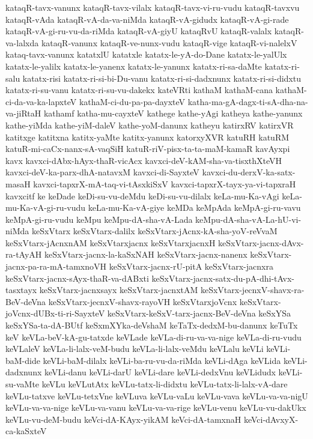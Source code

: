 {kataqR-tavx-vanunx
kataqR-tavx-vilalx
kataqR-tavx-vi-ru-vudu
kataqR-tavxvu
kataqR-vAda
kataqR-vA-da-va-niMda
kataqR-vA-gidudx
kataqR-vA-gi-rade
kataqR-vA-gi-ru-vu-da-riMda
kataqR-vA-giyU
kataqRvU
kataqR-valalx
kataqR-va-lalxda
kataqR-vanunx
kataqR-ve-nunx-vudu
kataqR-vige
kataqR-vi-nalelxV
kataq-tavx-vanunx
katatxlU
katatxle
katatx-le-yA-do-Dane
katatx-le-yalUlx
katatx-le-yalilx
katatx-le-yanenx
katatx-le-yanunx
katatx-ri-sa-daMte
katatx-ri-salu
katatx-risi
katatx-ri-si-bi-Du-vanu
katatx-ri-si-dadxnunx
katatx-ri-si-didxtu
katatx-ri-su-vanu
katatx-ri-su-vu-dakekx
kateVRti
kathaM
kathaM-cana
kathaM-ci-da-va-ka-lapxteV
kathaM-ci-du-pa-pa-dayxteV
katha-ma-gA-dagx-ti-sA-dha-na-va-jiRtaH
kathamf
katha-mu-cayxteV
kathege
kathe-yAgi
katheya
kathe-yanunx
kathe-yiMda
kathe-yiM-daleV
kathe-yoM-danunx
katheyu
katirxRV
katirxVR
katitxge
katitxna
katitx-yaMte
katitx-yanunx
katorxyXVR
katuRH
katuRM
katuR-mi-caCx-nanx-sA-vaqSiH
katuR-riV-pisx-ta-ta-maM-kamaR
kavAyxpi
kavx
kavxci-dAbx-hAyx-thaR-vicAcx
kavxci-deV-kAM-sha-va-tisxthXteVH
kavxci-deV-ka-parx-dhA-natavxM
kavxci-di-SayxteV
kavxci-du-derxV-ka-satx-masaH
kavxci-tapxrX-mA-taq-vi-tAsxkiSxV
kavxci-tapxrX-tayx-ya-vi-tapxraH
kavxcitf
ke
keDade
keDi-su-vu-deMdu
keDi-su-vu-dilalx
keLa-mu-Ka-vAgi
keLa-mu-Ka-vA-gi-ru-vudu
keLa-mu-Ka-vA-giye
keMDa
keMpAda
keMpA-gi-ru-vavu
keMpA-gi-ru-vudu
keMpu
keMpu-dA-sha-vA-Lada
keMpu-dA-sha-vA-La-hU-vi-niMda
keSxVtarx
keSxVtarx-dalilx
keSxVtarx-jAcnx-kA-sha-yoV-reVvaM
keSxVtarx-jAcnxnAM
keSxVtarxjacnx
keSxVtarxjacnxH
keSxVtarx-jacnx-dAvx-ra-tAyAH
keSxVtarx-jacnx-la-kaSxNAH
keSxVtarx-jacnx-nanenx
keSxVtarx-jacnx-pa-ra-mA-tamxnoVH
keSxVtarx-jacnx-rU-pitA
keSxVtarx-jacnxra
keSxVtarx-jacnx-sAyx-thaR-va-dABxti
keSxVtarx-jacnx-satx-du-pA-dhi-tAvx-tasxtayx
keSxVtarx-jacnxsayx
keSxVtarx-jacnxtAM
keSxVtarx-jecnxV-shavx-ra-BeV-deVna
keSxVtarx-jecnxV-shavx-rayoVH
keSxVtarxjoVcnx
keSxVtarx-joVcnx-dUBx-ti-ri-SayxteV
keSxVtarx-keSxV-tarx-jacnx-BeV-deVna
keSxYSa
keSxYSa-ta-dA-BUtf
keSxmXYka-deVshaM
keTaTx-dedxM-bu-danunx
keTuTx
keV
keVLa-beV-kA-gu-tatxde
keVLade
keVLa-di-ru-va-va-nige
keVLa-di-ru-vudu
keVLaleV
keVLa-li-lalx-veM-budu
keVLa-li-lalx-veMdu
keVLalu
keVLi
keVLi-baM-dide
keVLi-baM-dilalx
keVLi-ba-ru-vu-da-riMda
keVLi-dAga
keVLida
keVLi-dadxnunx
keVLi-danu
keVLi-darU
keVLi-dare
keVLi-dedxVnu
keVLidudx
keVLi-su-vaMte
keVLu
keVLutAtx
keVLu-tatx-li-didxtu
keVLu-tatx-li-lalx-vA-dare
keVLu-tatxve
keVLu-tetxVne
keVLuva
keVLu-vaLu
keVLu-vava
keVLu-va-va-nigU
keVLu-va-va-nige
keVLu-va-vanu
keVLu-va-va-rige
keVLu-venu
keVLu-vu-dakUkx
keVLu-vu-deM-budu
keVci-dA-KAyx-yikAM
keVci-dA-tamxnaH
keVci-dAvxyX-ca-kaSxteV
}
